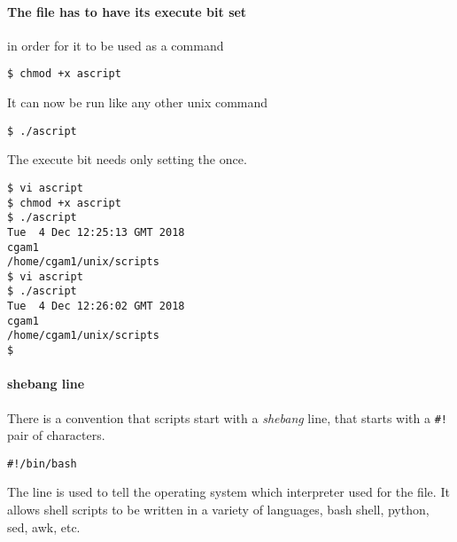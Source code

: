 \documentclass[12pt,a4paper]{article}
\begin{document}
\paragraph{The file has to have its execute bit set } in order for it
to be used as a command
\begin{terminal}
\begin{verbatim}
$ chmod +x ascript
\end{verbatim}
\end{terminal}
It can now be run like any other unix command
\begin{terminal}
\begin{verbatim}
$ ./ascript
\end{verbatim}
\end{terminal}
The execute bit needs only setting the once.

\begin{terminal}
\begin{verbatim}
$ vi ascript
$ chmod +x ascript
$ ./ascript
Tue  4 Dec 12:25:13 GMT 2018
cgam1
/home/cgam1/unix/scripts
$ vi ascript
$ ./ascript
Tue  4 Dec 12:26:02 GMT 2018
cgam1
/home/cgam1/unix/scripts
$
\end{verbatim}
\end{terminal}

\paragraph{shebang line}
There is a convention that scripts start with a \emph{shebang} line, that
starts with a \verb'#!' pair of characters.
\begin{code}
\begin{verbatim}
#!/bin/bash
\end{verbatim}
\end{code}
The line is used to tell the operating system which interpreter used for the
file.  It allows shell scripts to be written in a variety of languages, bash
shell, python, sed, awk, etc.
\end{document}
